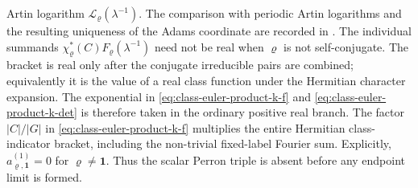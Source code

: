 \begin{theorem}
  Artin logarithm \(\mathcal L_\varrho(\lambda^{-1})\).  The comparison with
  periodic Artin logarithms and the resulting uniqueness of the Adams coordinate
  are recorded in
  .
  The individual summands
  \(\chi_\varrho^\ast(C)F_\varrho(\lambda^{-1})\) need not be real when
  \(\varrho\) is not self-conjugate.  The bracket is real only after the
  conjugate irreducible pairs are combined; equivalently it is the value of a
  real class function under the Hermitian character expansion.  The
  exponential in \eqref{eq:class-euler-product-k-f} and
  \eqref{eq:class-euler-product-k-det} is therefore taken in the
  ordinary positive real branch.  The factor \(|C|/|G|\) in
  \eqref{eq:class-euler-product-k-f} multiplies the entire Hermitian
  class-indicator bracket, including the non-trivial fixed-label Fourier sum.
  Explicitly,
  \(a_{\varrho,\mathbf1}^{(1)}=0\) for \(\varrho\ne\mathbf1\).  Thus the scalar
  Perron triple is absent before any
  endpoint limit is formed.
\end{theorem}

